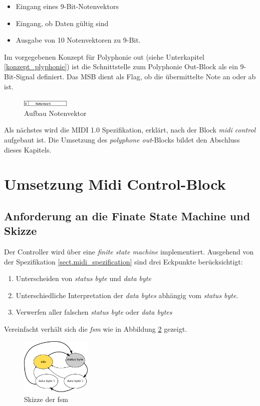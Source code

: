 \begin{itemize}
	\item Eingang eines 9-Bit-Notenvektors
    \item Eingang, ob Daten gültig sind
	\item Ausgabe von 10 Notenvektoren zu 9-Bit.
\end{itemize}
\bigskip

Im vorgegebenen Konzept für Polyphonie out (siehe Unterkapitel \ref{konzept_plyphonie}) ist die Schnittstelle zum Polyphonie Out-Block als ein 9-Bit-Signal definiert. Das MSB dient als Flag, ob die übermittelte Note an oder ab ist.

\begin{figure}[H]
	\includegraphics[width=0.2\textwidth]{images/midi_interface/NotenVektor.png}
	\caption{Aufbau Notenvektor}
	\label{fig.Notenvektor}
\end{figure}

Als nächstes wird die MIDI 1.0 Spezifikation, erklärt, nach der Block \textit{midi control} aufgebaut ist. Die Umsetzung des \textit{polyphone out}-Blocks bildet den Abschluss dieses Kapitels.




\newpage
\section{Umsetzung Midi Control-Block}\label{sect.midi_umsetzung}

\subsection{Anforderung an die Finate State Machine und Skizze}\label{anforderung_fsm}
Der Controller wird über eine \textit{finite state machine} implementiert. Ausgehend von der Spezifikation \ref{sect.midi_spezification} sind drei Eckpunkte berücksichtigt:
\begin{enumerate}
	\item Unterscheiden von \textit{status byte} und \textit{data byte}
	\item Unterschiedliche Interpretation der \textit{data bytes} abhängig vom \textit{status byte}.
	\item Verwerfen aller falschen \textit{status byte} oder \textit{data bytes}
\end{enumerate}
\smallskip
Vereinfacht verhält sich die \textit{fsm} wie in Abbildung \ref{fig.midi_fsm_skizze} gezeigt. 
\begin{figure}[H]
	\includegraphics[width=0.3\textwidth]{images/midi_control/fsm_grob_2.png}
	\caption{Skizze der fsm}
	\label{fig.midi_fsm_skizze}
\end{figure}

